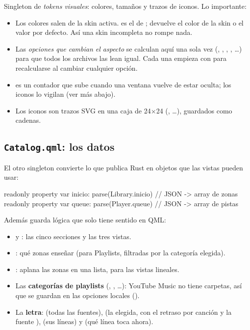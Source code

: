 Singleton de \emph{tokens visuales}: colores, tamaños y trazos de iconos. Lo importante:

\begin{itemize}
  \item Los colores salen de la skin activa.  es el  de
  ;  devuelve el color de la skin
  o el valor por defecto. Así una skin incompleta no rompe nada.
  \item Las \emph{opciones que cambian el aspecto} se calculan aquí una sola vez
  (, , , , \dots)
  para que todos los archivos las lean igual. Cada una empieza con  para recalcularse al cambiar cualquier opción.
  \item {} es un contador que sube cuando una ventana vuelve de estar oculta;
  los iconos lo vigilan (ver más abajo).
  \item Los iconos son trazos SVG en una caja de 24$\times$24 (, \dots),
  guardados como cadenas.
\end{itemize}

\subsection{\texttt{Catalog.qml}: los datos}

El otro singleton convierte lo que publica Rust en objetos que las vistas pueden usar:

\begin{qml}
readonly property var inicio: parse(Library.inicio)    // JSON -> array de zonas
readonly property var queue:  parse(Player.queue)       // JSON -> array de pistas
\end{qml}

Además guarda lógica que solo tiene sentido en QML:

\begin{itemize}
  \item {} y : las cinco secciones y las tres vistas.
  \item {}: qué zonas enseñar (para Playlists, filtradas por la categoría
  elegida).
  \item {}: aplana las zonas en una lista, para las vistas lineales.
  \item Las \textbf{categorías de playlists} (, ,
  \dots): YouTube Music no tiene carpetas, así que se guardan en las
  opciones locales ().
  \item La \textbf{letra}:  (todas las fuentes),  (la
  elegida, con el retraso por canción  y la fuente ),
   (sus líneas) y  (qué línea toca ahora).
\end{itemize}


